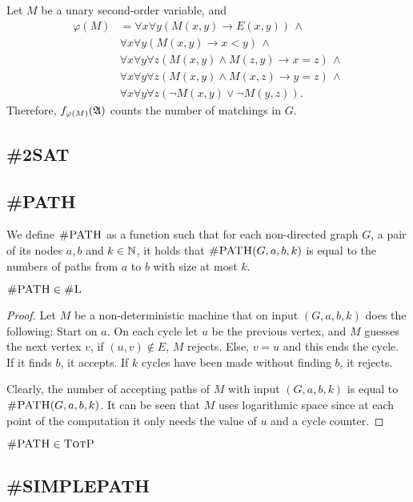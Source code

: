 Let $M$ be a unary second-order variable, and
\begin{align*}
\varphi(M) &= \forall x \forall y (M(x,y)\to E(x,y))\,\wedge \\
& \forall x \forall y (M(x,y)\to x < y)\,\wedge \\
& \forall x \forall y \forall z(M(x,y)\wedge M(z,y) \to x = z)\,\wedge \\
& \forall x \forall y \forall z(M(x,y)\wedge M(x,z) \to y = z)\,\wedge \\
& \forall x \forall y \forall z(\neg M(x,y)\vee \neg M(y,z)).
\end{align*}
Therefore, $f_{\varphi(M)}({\frak A})$ counts the number of matchings in $G$.

\subsection{\#2SAT}

\subsection{\#PATH}

We define $\textsc{\#PATH}$ as a function such that for each non-directed graph $G$, a pair of its nodes $a,b$ and $k\in\mathbb{N}$, it holds that $\textsc{\#PATH}(G,a,b,k)$ is equal to the numbers of paths from $a$ to $b$ with size at most $k$.

\begin{theo}
	 $\textsc{\#PATH} \in \textsc{\#L}$
\end{theo}
\begin{proof}
	Let $M$ be a non-deterministic machine that on input $(G,a,b,k)$ does the following: Start on $a$. On each cycle let $u$ be the previous vertex, and $M$ guesses the next vertex $v$, if $(u,v)\not\in E$, $M$ rejects. Else, $v = u$ and this ends the cycle. If it finds $b$, it accepts. If $k$ cycles have been made without finding $b$, it rejects.
	
	Clearly, the number of accepting paths of $M$ with input $(G,a,b,k)$ is equal to $\textsc{\#PATH}(G,a,b,k)$. It can be seen that $M$ uses logarithmic space since at each point of the computation it only needs the value of $u$ and a cycle counter.
\end{proof}

\begin{coro}
	 $\textsc{\#PATH} \in \textsc{TotP}$
\end{coro}

\subsection{\#SIMPLEPATH}

